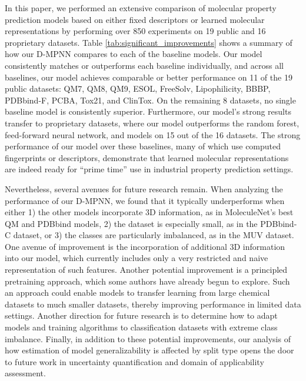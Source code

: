 \documentclass[journal=jcisd8,manuscript=article]{achemso}
\begin{document}
In this paper, we performed an extensive comparison of molecular property prediction models based on either fixed descriptors or learned molecular representations by performing over 850 experiments on 19 public and 16 proprietary datasets. Table \ref{tab:significant_improvements} shows a summary of how our D-MPNN compares to each of the baseline models. Our model consistently matches or outperforms each baseline individually, and across all baselines, our model achieves comparable or better performance on 11 of the 19 public datasets: QM7, QM8, QM9, ESOL, FreeSolv, Lipophilicity, BBBP, PDBbind-F, PCBA, Tox21, and ClinTox. On the remaining 8 datasets, no single baseline model is consistently superior. Furthermore, our model's strong results transfer to proprietary datasets, where our model outperforms the random forest, feed-forward neural network, and \citeauthor{mayr2018chembl}\cite{mayr2018chembl} models on 15 out of the 16 datasets. The strong performance of our model over these baselines, many of which use computed fingerprints or descriptors, demonstrate that learned molecular representations are indeed ready for ``prime time'' use in industrial property prediction settings.

Nevertheless, several avenues for future research remain. When analyzing the performance of our D-MPNN, we found that it typically underperforms when either 1) the other models incorporate 3D information, as in MoleculeNet's best QM and PDBbind models, 2) the dataset is especially small, as in the PDBbind-C dataset, or 3) the classes are particularly imbalanced, as in the MUV dataset. One avenue of improvement is the incorporation of additional 3D information into our model, which currently includes only a very restricted and naive representation of such features. Another potential improvement is a principled pretraining approach, which some authors have already begun to explore\cite{navarin2018pre,goh2018using}. Such an approach could enable models to transfer learning from large chemical datasets to much smaller datasets, thereby improving performance in limited data settings. Another direction for future research is to determine how to adapt models and training algorithms to classification datasets with extreme class imbalance. Finally, in addition to these potential improvements, our analysis of how estimation of model generalizability is affected by split type opens the door to future work in uncertainty quantification and domain of applicability assessment. 
\end{document}

